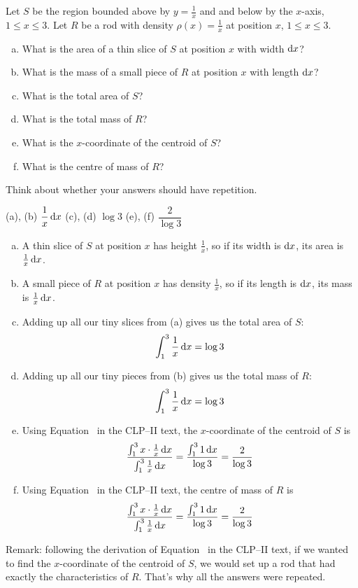 \begin{question}
Let $S$ be the region bounded above by $y=\frac{1}{x}$ and and below by the $x$-axis, $1 \le x \le 3$. Let $R$ be a rod with density $\rho(x)=\frac{1}{x}$ at position $x$, $1 \le x \le 3$.
\begin{enumerate}[(a)]
\item What is the area of a thin slice of $S$ at position $x$ with width $\mathrm{d}x$?
\item What is the mass of a small piece of $R$ at position $x$ with length $\mathrm{d}x$?
\item What is the total area of $S$?
\item What is the total mass of $R$?
\item What is the $x$-coordinate of the centroid of $S$?
\item What is the centre of mass of $R$?
\end{enumerate}
\end{question}
\begin{hint}
Think about whether your answers should have repetition.
\end{hint}
\begin{answer}
(a), (b) $\dfrac{1}{x}\,\mathrm{d}x$\qquad
(c), (d) $\log 3$\qquad
(e), (f) $\dfrac{2}{\log 3}$
\end{answer}
\begin{solution}
\begin{enumerate}[(a)]
\item A thin slice of $S$ at position $x$ has height $\frac{1}{x}$, so if its width is $\mathrm{d}x$, its area is $\frac{1}{x}\,\mathrm{d}x$.
\item A small piece of $R$ at position $x$ has density $\frac{1}{x}$, so if its length is $\mathrm{d}x$, its mass is $\frac{1}{x}\,\mathrm{d}x$.
\item Adding up all our tiny slices from (a) gives us the total area of $S$:
\[\int_1^3 \frac{1}{x}\,\mathrm{d}x = \log 3\]
\item Adding up all our tiny pieces from (b) gives us the total mass of $R$:
\[\int_1^3 \frac{1}{x}\,\mathrm{d}x=\log 3\]
\item Using Equation~ in the CLP--II text,
 the $x$-coordinate of the centroid of $S$ is
 \[\frac{\int_1^3 x\cdot\frac{1}{x}\,\mathrm{d}x}{\int_1^3\frac{1}{x}\,\mathrm{d}x} = \frac{\int_1^3 1\,\mathrm{d}x}{\log 3} = \frac{2}{\log 3}\]
\item Using Equation~ in the CLP--II text,
 the centre of mass of $R$ is
 \[\frac{\int_1^3 x\cdot\frac{1}{x}\,\mathrm{d}x}{\int_1^3\frac{1}{x}\,\mathrm{d}x} = \frac{\int_1^3 1\,\mathrm{d}x}{\log 3} = \frac{2}{\log 3}\]
\end{enumerate}
Remark: following the derivation of Equation~ in the CLP--II text,
if we wanted to find the $x$-coordinate of the centroid of $S$, we would set up a rod that had exactly the characteristics of $R$. That's why all the answers were repeated.
\end{solution}

